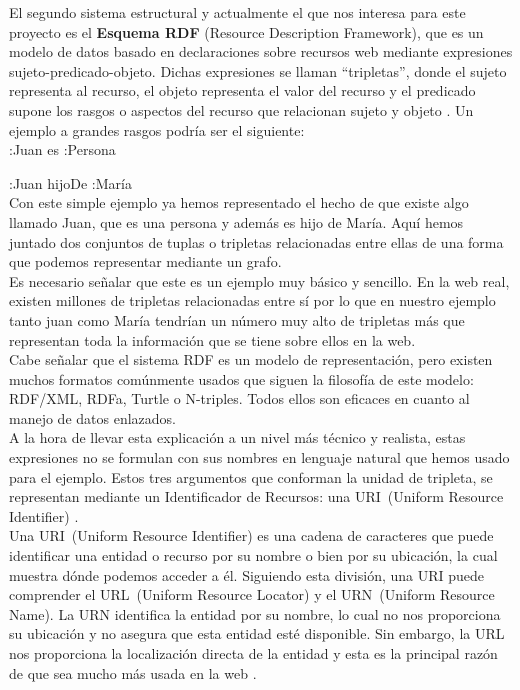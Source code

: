 El segundo sistema estructural y actualmente el que nos interesa para este proyecto es el \textbf{Esquema RDF} (Resource Description Framework), que es un modelo de datos basado en declaraciones sobre recursos web mediante expresiones sujeto-predicado-objeto. Dichas expresiones se llaman ``tripletas'', donde el sujeto representa al recurso, el objeto representa el valor del recurso y el predicado supone los rasgos o aspectos del recurso que relacionan sujeto y objeto \cite{sakr2018}. Un ejemplo a grandes rasgos podría ser el siguiente:\\

:Juan es :Persona

:Juan hijoDe :María\\

Con este simple ejemplo ya hemos representado el hecho de que existe algo llamado Juan, que es una persona y además es hijo de María. Aquí hemos juntado dos conjuntos de tuplas o tripletas relacionadas entre ellas de una forma que podemos representar mediante un grafo.\\

Es necesario señalar que este es un ejemplo muy básico y sencillo. En la web real, existen millones de tripletas relacionadas entre sí por lo que en nuestro ejemplo tanto juan como María tendrían un número muy alto de tripletas más que representan toda la información que se tiene sobre ellos en la web.\\

Cabe señalar que el sistema RDF es un modelo de representación, pero existen muchos formatos comúnmente usados que siguen la filosofía de este modelo: RDF/XML, RDFa, Turtle o N-triples. Todos ellos son eficaces en cuanto al manejo de datos enlazados.\\

A la hora de llevar esta explicación a un nivel más técnico y realista, estas expresiones no se formulan con sus nombres en lenguaje natural que hemos usado para el ejemplo. Estos tres argumentos que conforman la unidad de tripleta, se representan mediante un Identificador de Recursos: una URI~(Uniform Resource Identifier) \cite{sakr2018,berners2007}.\\

Una URI~(Uniform Resource Identifier) es una cadena de caracteres que puede identificar una entidad o recurso por su nombre o bien por su ubicación, la cual muestra dónde podemos acceder a él. Siguiendo esta división, una URI puede comprender el URL~(Uniform Resource Locator) y el URN~(Uniform Resource Name). La URN identifica la entidad por su nombre, lo cual no nos proporciona su ubicación y no asegura que esta entidad esté disponible. Sin embargo, la URL nos proporciona la localización directa de la entidad y esta es la principal razón de que sea mucho más usada en la web \cite{berners1994,saint2017,sakr2018}.\\

